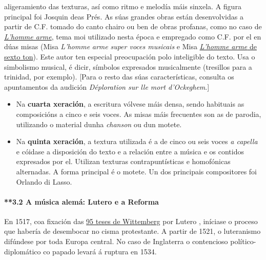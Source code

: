 \documentclass[
]{article}
\begin{document}
\begin{itemize}
  aligeramiento das texturas, así como ritmo e melodía máis sinxela. A
  figura principal foi Josquin deas Prés. As súas grandes obras están
  desenvolvidas a partir de C.F. tomado do canto chairo ou ben de obras
  profanas, como no caso de
  \href{http://open.spotify.com/track/5SWo3PgUcCLFblqvS2U0sw}{\emph{L'homme
  arme},} tema moi utilizado nesta época e empregado como C.F. por el en
  dúas misas (Misa \emph{L'homme} \emph{arme} \emph{super voces
  musicais} e Misa
  \href{http://open.spotify.com/track/4bx9nePdM3wwj3Z7FZ0owv}{\emph{L'homme
  arme} de sexto ton}). Este autor ten especial preocupación polo
  inteligible do texto. Usa o simbolismo musical, é dicir, símbolos
  expresados musicalmente (tresillos para a trinidad, por exemplo).
  {[}Para o resto das súas características, consulta os apuntamentos da
  audición \emph{Déploration sur lle mort d'Ockeghem}.{]}
\end{itemize}

\begin{itemize}
\item
  Na \textbf{cuarta xeración}, a escritura vólvese máis densa, sendo
  habituais as composicións a cinco e seis voces. As misas máis
  frecuentes son as de parodia, utilizando o material dunha
  \emph{chanson} ou dun motete.
\item
  Na \textbf{quinta xeración}, a textura utilizada é a de cinco ou seis
  voces \emph{a capella} e cóidase a disposición do texto e a relación
  entre a música e os contidos expresados por el. Utilizan texturas
  contrapuntísticas e homofónicas alternadas. A forma principal é o
  motete. Un dos principais compositores foi Orlando di Lasso.
\end{itemize}

\hypertarget{32-a-muxfasica-alemuxe1-lutero-e-a-reforma}{%
\paragraph{\texorpdfstring{**3.2 A música alemá: Lutero e a Reforma
}{**3.2 A música alemá: Lutero e a Reforma }}\label{32-a-muxfasica-alemuxe1-lutero-e-a-reforma}}

En 1517, coa fixación das
\href{http://es.wikipedia.org/wiki/Las_95_tesis}{95 teses de Wittemberg}
por Lutero \href{http://es.wikipedia.org/wiki/Mart\%C3\%ADn_Lutero}{,}
iníciase o proceso que habería de desembocar no cisma protestante. A
partir de 1521, o luteranismo difúndese por toda Europa central. No caso
de Inglaterra o contencioso político-diplomático co papado levará á
ruptura en 1534.
\end{document}
